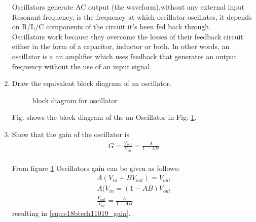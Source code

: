\begin{enumerate}[label=\thesection.\arabic*.,ref=\thesection.\theenumi]

Oscillators generate AC output (the waveform),without any external input \\
Resonant frequency, is the frequency at which oscillator oscillates, it depends on R/L/C components of the circuit it's been fed back through.\\
Oscillators work because they overcome the losses of their feedback circuit either in the form of a capacitor, inductor or both. In other words, an oscillator is a an amplifier which uses feedback that generates an output frequency without the use of an input signal.\\ %
\newline

\item Draw the equivalent block diagram of an oscillator.\\
\solution
\begin{figure}[!ht]
    \begin{center}
		
		\resizebox{\columnwidth}{!}{} %
	\end{center}
\caption{block diagram for oscillator}
\label{fig:ee18btech11019_hart_block}
\end{figure}
Fig. \label{fig:ee18btech11019_hart_block} shows the block diagram of the an Oscillator in Fig. \ref{fig:ee18btech11019_hart_block}.\\




\item Show that the gain of the oscillator is \\
\begin{align}
    G = \frac{V_{out}}{V_{in}} = \frac{A}{1 - AB}
\label{eq:ee18btech11019_gain}
\end{align}
%
\\
\solution From figure \ref{fig:ee18btech11019_hart_block}
Oscillators gain can be given as follows:\\
\begin{align}
    A(V_{in} + BV_{out}) =V_{out}\\
    A(V_{in} = (1-AB)V_{out}\\
    \frac{V_{out}}{V_{in}} = \frac{A}{1 - AB}
\end{align}
%
resulting in \eqref{eq:ee18btech11019_gain}.\\




\end{enumerate}
